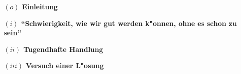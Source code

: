 \documentclass[a4paper, emulatestandardclasses, 12pt]{scrartcl}
\begin{document}
\begin{onehalfspace} 



\noindent\textbf{$(o)$ Einleitung}

\noindent 

\vspace{5mm}

\noindent\textbf{$(i)$ "`Schwierigkeit, wie wir gut werden k"onnen, ohne es schon zu sein"'}

\noindent 

\vspace{5mm}
\noindent\textbf{$(ii)$ Tugendhafte Handlung}	

\noindent 


\vspace{5mm}
\noindent\textbf{$(iii)$ Versuch einer L"osung}	

\noindent 


\vspace{5mm}

%
%
\vspace{3mm}

\end{onehalfspace}
\nocite{*}

\end{document}
